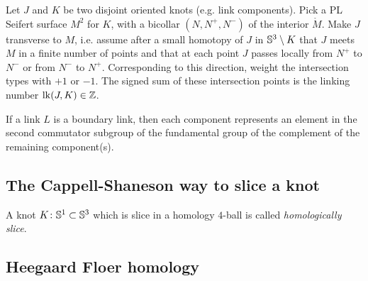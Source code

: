 \begin{definition}
	\label{def:linking_numbers_via_intersections_with_Seifert_surface}
	Let $J$ and $K$ be two disjoint oriented knots (e.g. link components).
	Pick a PL Seifert surface $M^{2}$ for $K$, with
	a bicollar $(N, N^{+}, N^{-})$ of the interior $\mathring{M}$.
	Make $J$ transverse to $M$, i.e. assume after a small
	homotopy of $J$ in $\mathbb{S}^{3} \setminus K$ that
	$J$ meets $M$ in a finite number of points
	and that at each point $J$ passes locally
	from $N^{+}$ to $N^{-}$ or from $N^{-}$ to $N^{+}$.
	Corresponding to this direction, weight the intersection types
	with $+1$ or $-1$.
	The signed sum of these intersection points is the linking
	number $\operatorname{lk}(J, K) \in \mathbb{Z}$.
\end{definition}

\begin{proposition}
	If a link $L$ is a boundary link, then each component
	represents an element
	in the second commutator subgroup
	of the fundamental group of the complement
	of the remaining component(s).
\end{proposition}

\subsection{The Cappell-Shaneson way to slice a knot}

\citep[4.1]{Teichner2010}

\begin{definition}
	A knot $K \colon \mathbb{S}^{1} \subset \mathbb{S}^{3}$ which is slice in a homology $4$-ball
	is called \textit{homologically slice}.
\end{definition}


\subsection{Heegaard Floer homology}


